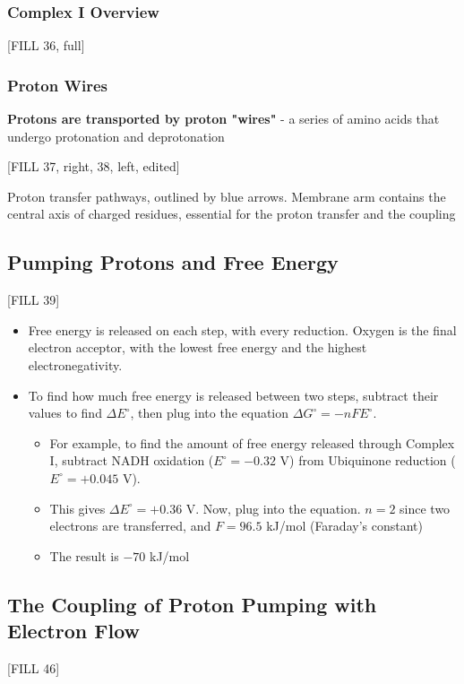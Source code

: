 \documentclass[10pt]{article}
\begin{document}
\subsubsection*{Complex I Overview}
\begin{center} 
	[FILL 36, full]
\end{center}

\subsubsection*{Proton Wires}
\textbf{Protons are transported by proton "wires"} - a series of amino acids that undergo protonation and deprotonation
\begin{center} 
	[FILL 37, right, 38, left, edited]
\end{center}
Proton transfer pathways, outlined by blue arrows.  Membrane arm contains the central axis of charged residues, essential for the proton transfer and the coupling

\subsection*{Pumping Protons and Free Energy}
\begin{center} 
	[FILL 39]
\end{center}
\begin{itemize}
	\item Free energy is released on each step, with every reduction.  Oxygen is the final electron acceptor, with the lowest free energy and the highest electronegativity.
	\item To find how much free energy is released between two steps, subtract their values to find $\Delta E^\circ$, then plug into the equation $\Delta G^\circ = -nFE^\circ$.
	\begin{itemize}
        \item For example, to find the amount of free energy released through Complex I, subtract NADH oxidation ($E^\circ = -0.32$ V) from Ubiquinone reduction ($E^\circ = +0.045$ V).
        \item This gives $\Delta E^\circ = +0.36$ V.  Now, plug into the equation.  $n = 2$ since two electrons are transferred, and $F = 96.5$ kJ/mol (Faraday's constant)
        \item The result is $-70$ kJ/mol 
    \end{itemize}
\end{itemize}

\subsection*{The Coupling of Proton Pumping with Electron Flow}
\begin{center} 
	[FILL 46]
\end{center}
\end{document}
